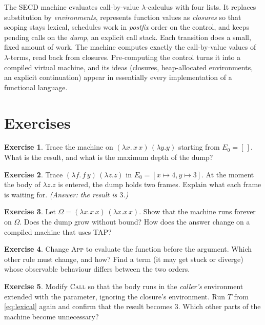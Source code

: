 \documentclass[11pt,a4paper]{article}
\newcommand{\emp}{[\,]}
\newcommand{\rul}[1]{\textsc{#1}}
\newcommand{\ins}[1]{\textsf{#1}}
\theoremstyle{definition}
\newtheorem{exercise}{Exercise}
\theoremstyle{plain}
\begin{document}
The SECD machine evaluates call-by-value $\lambda$-calculus with four lists.
It replaces substitution by \emph{environments}, represents function values
as \emph{closures} so that scoping stays lexical, schedules work in
\emph{postfix} order on the control, and keeps pending calls on the
\emph{dump}, an explicit call stack. Each transition does a small, fixed
amount of work. The machine computes exactly the call-by-value values of
$\lambda$-terms, read back from closures. Pre-computing the control turns it
into a compiled virtual machine, and its ideas (closures, heap-allocated
environments, an explicit continuation) appear in essentially every
implementation of a functional language.

\section*{Exercises}

\begin{exercise}
Trace the machine on $(\lambda x.\,x\,x)\,(\lambda y.y)$ starting from
$E_0 = \emp$. What is the result, and what is the maximum depth of the dump?
\end{exercise}

\begin{exercise}
Trace $(\lambda f.\,f\,y)\,(\lambda z.z)$ in $E_0 = [x\mapsto 4, y\mapsto 3]$. At
the moment the body of $\lambda z.z$ is entered, the dump holds two frames.
Explain what each frame is waiting for. \emph{(Answer: the result is $3$.)}
\end{exercise}

\begin{exercise}
Let $\Omega = (\lambda x.x\,x)\,(\lambda x.x\,x)$. Show that the machine runs
forever on $\Omega$. Does the dump grow without bound? How does the answer
change on a compiled machine that uses \ins{TAP}?
\end{exercise}

\begin{exercise}
Change \rul{App} to evaluate the function before the argument. Which other
rule must change, and how? Find a term (it may get stuck or diverge) whose
observable behaviour differs between the two orders.
\end{exercise}

\begin{exercise}\label{ex:dynamic}
Modify \rul{Call} so that the body runs in the \emph{caller's} environment
extended with the parameter, ignoring the closure's environment. Run $T$
from \eqref{eq:lexical} again and confirm that the result becomes $3$. Which
other parts of the machine become unnecessary?
\end{exercise}
\end{document}
